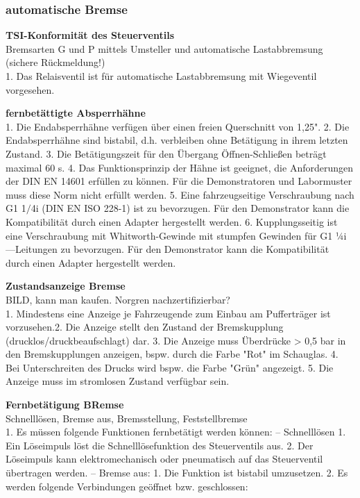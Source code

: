 \subsubsection{automatische Bremse}
\textbf{TSI-Konformität des Steuerventils}\\ Bremsarten G und P mittels Umsteller und automatische Lastabbremsung (sichere Rückmeldung!)\\ 1.	Das Relaisventil ist für automatische Lastabbremsung mit Wiegeventil vorgesehen. \par
\textbf{fernbetättigte Absperrhähne}\\1.	Die Endabsperrhähne verfügen über einen freien Querschnitt von 1,25".
2.	Die Endabsperrhähne sind bistabil, d.h. verbleiben ohne Betätigung in ihrem letzten Zustand.
3.	Die Betätigungszeit für den Übergang Öffnen-Schließen beträgt maximal 60 s.
4.	Das Funktionsprinzip der Hähne ist geeignet, die Anforderungen der DIN EN 14601 erfüllen zu können. Für die Demonstratoren und Labormuster muss diese Norm nicht erfüllt werden.
5.	Eine fahrzeugseitige Verschraubung nach G1 1$/$4i (DIN EN ISO 228-1) ist zu bevorzugen. Für den Demonstrator kann die Kompatibilität durch einen Adapter hergestellt werden.
6.	Kupplungsseitig ist eine Verschraubung mit Whitworth-Gewinde mit stumpfen Gewinden für G1 1⁄4i—Leitungen zu bevorzugen. Für den Demonstrator kann die Kompatibilität durch einen Adapter hergestellt werden.
 \par
\textbf{Zustandsanzeige Bremse}\\ BILD, kann man kaufen. Norgren nachzertifizierbar?\\ 1.	Mindestens eine Anzeige je Fahrzeugende zum Einbau am Pufferträger ist vorzusehen.2.	Die Anzeige stellt den Zustand der Bremskupplung (drucklos/druckbeaufschlagt) dar.
3.	Die Anzeige muss Überdrücke > 0,5 bar in den Bremskupplungen anzeigen, bspw. durch die Farbe "Rot" im Schauglas.
4.	Bei Unterschreiten des Drucks wird bspw. die Farbe "Grün" angezeigt.
5.	Die Anzeige muss im stromlosen Zustand verfügbar sein.\par
\textbf{Fernbetätigung BRemse}\\ Schnelllösen, Bremse aus, Bremsstellung, Feststellbremse\\ 1.	Es müssen folgende Funktionen fernbetätigt werden können:
–	Schnelllösen 1.	Ein Löseimpuls löst die Schnelllösefunktion des Steuerventils aus.
2.	Der Löseimpuls kann elektromechanisch oder pneumatisch auf das Steuerventil übertragen werden.
–	Bremse aus: 1.	Die Funktion ist bistabil umzusetzen.
2.	Es werden folgende Verbindungen geöffnet bzw. geschlossen:
